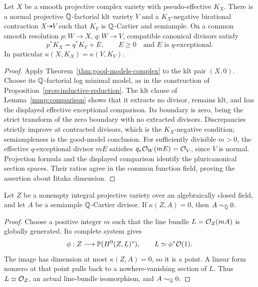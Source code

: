 \begin{corollary}\label{cor:smooth-good-model}
Let \(X\) be a smooth projective complex variety with pseudo-effective
\(K_X\). There is a normal projective \(\mathbb{Q}\)-factorial klt variety
\(V\) and a \(K_X\)-negative birational contraction \(X\dashrightarrow V\)
such that \(K_V\) is \(\mathbb{Q}\)-Cartier and semiample. On a common smooth
resolution \(p:W\to X\), \(q:W\to V\), compatible canonical divisors
satisfy
\[
 p^*K_X=q^*K_V+E,
 \qquad E\geq0\quad\text{and }E\text{ is }q\text{-exceptional}.
\]
In particular \(\kappa(X,K_X)=\kappa(V,K_V)\).
\end{corollary}
\begin{proof}
Apply Theorem~\ref{thm:good-models-complex} to the klt pair \((X,0)\).
Choose its \(\mathbb{Q}\)-factorial log minimal model, as in the construction
of Proposition~\ref{prop:inductive-reduction}. The klt clause of
Lemma~\ref{mmp:comparison} shows that it extracts no divisor, remains
klt, and has the displayed effective exceptional comparison.
Its boundary is zero, being the strict transform of the zero boundary
with no extracted divisors.
Discrepancies strictly improve at contracted divisors, which is the
\(K_X\)-negative condition; semiampleness is the good-model conclusion.
For sufficiently divisible \(m>0\), the effective \(q\)-exceptional
divisor \(mE\) satisfies \(q_*\mathcal{O}_W(mE)=\mathcal{O}_V\), since \(V\) is
normal. Projection formula and the displayed comparison identify the
pluricanonical section spaces. Their ratios agree in the common
function field, proving the assertion about Iitaka dimension.
\end{proof}

\begin{lemma}\label{lem:semiample-zero}
Let \(Z\) be a nonempty integral projective variety over an algebraically
closed field, and let \(A\) be a semiample \(\mathbb{Q}\)-Cartier divisor.
If \(\kappa(Z,A)=0\), then \(A\sim_{\mathbb{Q}}0\).
\end{lemma}
\begin{proof}
Choose a positive integer \(m\) such that the line bundle
\(L=\mathcal{O}_Z(mA)\) is globally generated. Its complete system gives
\[
 \phi:Z\longrightarrow\mathbb{P}(H^0(Z,L)^*),\qquad
 L\simeq\phi^*\mathcal{O}(1).
\]
The image has dimension at most \(\kappa(Z,A)=0\), so it is a point.
A linear form nonzero at that point pulls back to a nowhere-vanishing
section of \(L\). Thus \(L\simeq\mathcal{O}_Z\), an actual line-bundle
isomorphism, and \(A\sim_{\mathbb{Q}}0\).
\end{proof}

